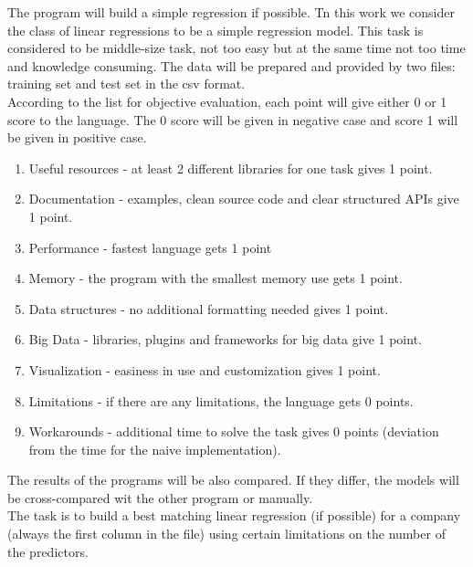 \documentclass{article}
\begin{document}
The program will build a simple regression if possible. Tn this work we consider the class of linear regressions to be a simple regression model. This task is considered to be middle-size task, not too easy but at the same time not too time and knowledge consuming.
The data will be prepared and provided by two files: training set and test set in the csv format.\\
According to the list for objective evaluation, each point will give either 0 or 1 score to the language. The 0 score will be given in negative case and score 1 will be given in positive case.
\begin{enumerate}
    \item[] Useful resources - at least 2 different libraries for one task gives 1 point.
    \item[] Documentation - examples, clean source code and clear structured APIs give 1 point.
    \item[] Performance - fastest language gets 1 point
    \item[] Memory - the program with the smallest memory use gets 1 point.
    \item[] Data structures - no additional formatting needed gives 1 point.
    \item[] Big Data - libraries, plugins and frameworks for big data give 1 point.
    \item[] Visualization - easiness in use and customization gives 1 point.
    \item[] Limitations - if there are any limitations, the language gets 0 points.
    \item[] Workarounds - additional time to solve the task gives 0 points (deviation from the time for the naive implementation).
\end{enumerate}
The results of the programs will be also compared. If they differ, the models will be cross-compared wit the other program or manually.\\
The task is to build a best matching linear regression (if possible) for a company (always the first column in the file) using certain limitations on the number of the predictors.
\end{document}
